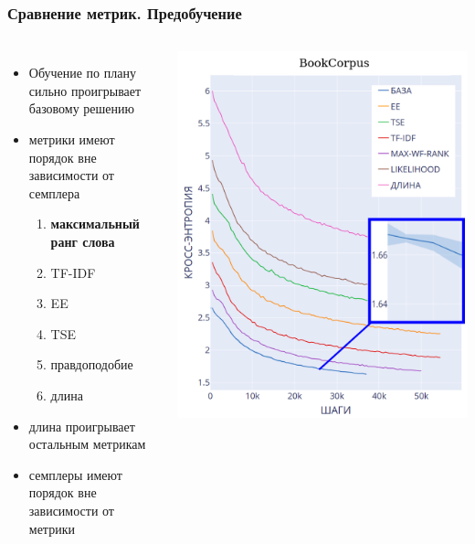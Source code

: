 \documentclass{beamer}
\begin{document}
\begin{frame}
	\frametitle{Сравнение метрик. Предобучение}
	\begin{columns}
			\begin{itemize}
				\item Обучение по плану сильно проигрывает базовому решению
				\item метрики имеют порядок вне зависимости от семплера
				\begin{enumerate}
					\item {\bf максимальный ранг слова}
					\item TF-IDF
					\item EE
					\item TSE
					\item правдоподобие
					\item длина
				\end{enumerate}
				\item длина проигрывает остальным метрикам
				\item семплеры имеют порядок вне зависимости от метрики
			\end{itemize}
			\includegraphics[scale=0.28]{BookCorpus_results}
	\end{columns}
\end{frame}
\end{document}

